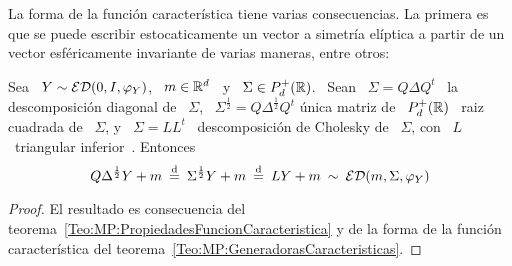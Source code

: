 La forma de la funci\'on caracter\'istica tiene varias consecuencias. La primera
es  que se  puede escribir  estocaticamente un  vector a  simetr\'ia  el\'iptica a
partir de un vector esf\'ericamente invariante de varias maneras, entre otros:
%
\begin{corolario}
  Sea  \ $Y  \sim  \mathcal{ED}(0,I,\varphi_Y)$, \  $m \in  \mathbb{R}^d$  \ y  \ $\Sigma  \in
  P_d^+(\mathbb{R})$. \ Sean \ $\Sigma = Q \Delta Q^t$ \ la descomposici\'on diagonal
  de \ $\Sigma$, \ $\Sigma^{\frac12} = Q \Delta^{\frac12} Q^t$ \'unica matriz de
  \  $P_d^+(\mathbb{R})$ \  raiz cuadrada  de \  $\Sigma$,  y \  $\Sigma =  L L^t$  \
  descomposici\'on  de  Cholesky   de  \  $\Sigma$,  con  \   $L$  \  triangular
  inferior~\cite{HorJoh13, Bha07}.  Entonces
  \[
  Q \Delta^{\frac12} Y + m \: \stackrel{\mathrm{d}}{=} \:  \Sigma^{\frac12} Y + m \: \stackrel{\mathrm{d}}{=} \: L Y
  + m \: \sim \: \mathcal{ED}(m,\Sigma,\varphi_Y)
  \]
\end{corolario}
%
\begin{proof}
  El             resultado            es             consecuencia            del
  teorema~\ref{Teo:MP:PropiedadesFuncionCaracteristica}  y  de  la forma  de  la
  funci\'on caracter\'istica del teorema~\ref{Teo:MP:GeneradorasCaracteristicas}.
\end{proof}

